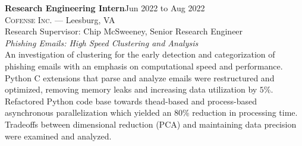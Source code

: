 \documentclass[hidelinks, 10pt]{article}
\def\contentwidth{0.9\linewidth}    %
\def\contentblockspacing{2.5mm}     %
\def\contentheaderspacing{1mm}      %
\begin{document}
{\begin{minipage}[ct]{\contentwidth}
    \textbf{Research Engineering Intern}\hfill Jun 2022 to Aug 2022\\
    \textsc{Cofense Inc.} --- Leesburg, VA\\
    Research Supervisor: Chip McSweeney, Senior Research Engineer
    \vspace{\contentheaderspacing}\\
    {\textit{Phishing Emails: High Speed Clustering and Analysis}}\\
    An investigation of clustering for the early detection and categorization of phishing emails with an emphasis on computational speed
    and performance.  Python C extensions that parse and analyze emails were restructured and optimized, removing memory leaks and
    increasing data utilization by $5$\%. Refactored Python code base towards thead-based and process-based asynchronous parallelization
    which yielded an $80$\% reduction in processing time. Tradeoffs between dimensional reduction (PCA) and maintaining data precision were
    examined and analyzed.
\end{minipage}

\vspace{\contentblockspacing}

}
\end{document}
